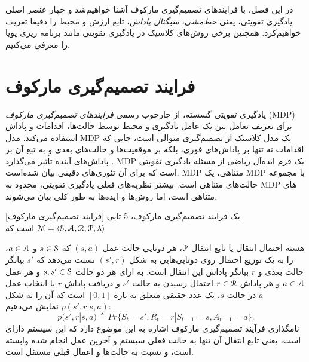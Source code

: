 
  در این فصل، با فرایندهای تصمیم‌گیری مارکوف آشنا خواهیم‌شد و چهار عنصر اصلی یادگیری تقویتی، یعنی \textit{خط‌مشی}، \textit{سیگنال پاداش}، تابع ارزش و محیط را دقیقا تعریف خواهیم‌کرد. همچنین برخی روش‌های کلاسیک در یادگیری تقویتی مانند برنامه ریزی پویا را معرفی می‌کنیم.



\section{فرایند تصمیم‌گیری مارکوف}

یادگیری تقویتی گسسته، از چارچوب رسمی \textit{فرایندهای تصمیم‌گیری مارکوف} 
 (MDP)
 برای تعریف تعامل بین یک عامل یادگیری و محیط توسط حالت‌ها، اقدامات و پاداش استفاده می‌کند. مدل MDP یک مدل کلاسیک از تصمیم‌گیری متوالی است، جایی که اقدامات نه تنها بر پاداش‌های فوری، بلکه بر موقعیت‌ها و حالت‌های بعدی و به تبع آن بر پاداش‌های آینده تأثیر می‌گذارد
 \cite{suttonbook}.
MDP
 یک فرم ایده‌آل ریاضی از مسئله یادگیری تقویتی است که برای آن تئوری‌های دقیقی بیان شده‌است.
MDP متناهی،
 یک MDP با مجموعه حالت‌های متناهی است. 
بیشتر نظریه‌های فعلی یادگیری تقویتی، محدود به MDP  های متناهی است، اما روش‌ها و ایده‌ها به طور کلی بیان می‌شوند.


[فرایند تصمیم‌گیری مارکوف] 
یک فرایند تصمیم‌گیری مارکوف، 5 تایی 
$\EuScript{M} = \left< \EuScript{S},\EuScript{A},\EuScript{R},\EuScript{P}, \lambda \right>$
است که

هسته احتمال انتقال یا تابع انتقال $\EuScript{P}$، هر دوتایی حالت-عمل
$(s,a)$ که 
$s \in \EuScript{S}$
و
$a \in \EuScript{A}$، را به یک توزیع احتمال روی دوتایی‌هایی به شکل 
$(s',r)$
نسبت می‌دهد که $s'$ بیانگر حالت بعدی و $r$ بیانگر پاداش این انتقال است. به ازای هر دو حالت 
$s,s' \in \EuScript{S}$
 و هر عمل 
 $a \in \EuScript{A}$
  و هر پاداش 
  $r \in \EuScript{R}$
  احتمال رسیدن به حالت $s'$ و دریافت پاداش $r$ با انتخاب عمل $a$ در حالت $s$، یک عدد حقیقی متعلق به  بازه $[0,1]$ است که آن را به شکل
$p(s',r|s,a)$
نمایش می‌دهیم:
$$p(s',r|s,a) \triangleq Pr\{S_t=s',R_t=r|S_{t-1}=s,A_{t-1}=a\}.$$ 
نام\nf گذاری فرآیند تصمیم‌گیری مارکوف اشاره به این موضوع دارد که این سیستم‌ دارای   است، یعنی تابع انتقال آن تنها به حالت فعلی سیستم و آخرین عمل انجام شده وابسته است، و نسبت به حالت‌ها و اعمال قبلی مستقل است.

